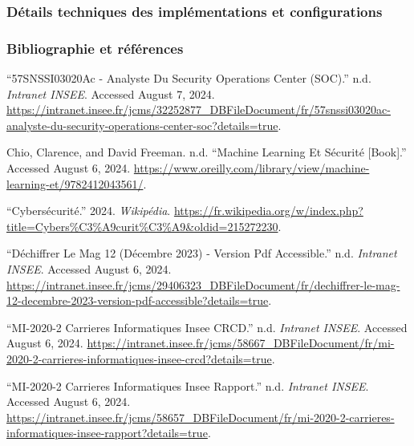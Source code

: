 \documentclass[
  letterpaper,
  DIV=11,
  numbers=noendperiod]{scrartcl}
\newlength{\cslhangindent}
\newenvironment{CSLReferences}[2] %
 {\begin{list}{}{%
  \setlength{\itemindent}{0pt}
  \setlength{\leftmargin}{0pt}
  \setlength{\parsep}{0pt}
  \ifodd #1
   \setlength{\leftmargin}{\cslhangindent}
   \setlength{\itemindent}{-1\cslhangindent}
  \fi
  \setlength{\itemsep}{#2\baselineskip}}}
 {\end{list}}
\begin{document}
\subsubsection{Détails techniques des implémentations et
configurations}\label{duxe9tails-techniques-des-impluxe9mentations-et-configurations}

\subsubsection{Bibliographie et
références}\label{bibliographie-et-ruxe9fuxe9rences}

\label{refs}
\begin{CSLReferences}{1}{0}
{``{57SNSSI03020Ac} - {Analyste} Du {Security} {Operations} {Center}
({SOC}).''} n.d. \emph{Intranet INSEE}. Accessed August 7, 2024.
\url{https://intranet.insee.fr/jcms/32252877_DBFileDocument/fr/57snssi03020ac-analyste-du-security-operations-center-soc?details=true}.

Chio, Clarence, and David Freeman. n.d. {``Machine {Learning} Et
Sécurité {[}{Book}{]}.''} Accessed August 6, 2024.
\url{https://www.oreilly.com/library/view/machine-learning-et/9782412043561/}.

{``Cybersécurité.''} 2024. \emph{Wikipédia}.
\url{https://fr.wikipedia.org/w/index.php?title=Cybers\%C3\%A9curit\%C3\%A9&oldid=215272230}.

{``Déchiffrer Le {Mag} 12 (Décembre 2023) - Version Pdf Accessible.''}
n.d. \emph{Intranet INSEE}. Accessed August 6, 2024.
\url{https://intranet.insee.fr/jcms/29406323_DBFileDocument/fr/dechiffrer-le-mag-12-decembre-2023-version-pdf-accessible?details=true}.

{``{MI}-2020-2 {Carrieres} Informatiques {Insee} {CRCD}.''} n.d.
\emph{Intranet INSEE}. Accessed August 6, 2024.
\url{https://intranet.insee.fr/jcms/58667_DBFileDocument/fr/mi-2020-2-carrieres-informatiques-insee-crcd?details=true}.

{``{MI}-2020-2 {Carrieres} Informatiques {Insee} {Rapport}.''} n.d.
\emph{Intranet INSEE}. Accessed August 6, 2024.
\url{https://intranet.insee.fr/jcms/58657_DBFileDocument/fr/mi-2020-2-carrieres-informatiques-insee-rapport?details=true}.


\end{CSLReferences}
\end{document}
